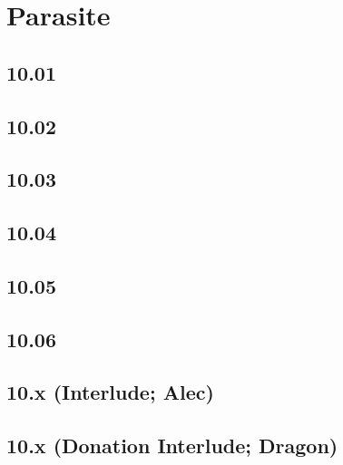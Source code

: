 \part{Parasite}
 \chapter{10.01}
 \chapter{10.02}
 \chapter{10.03}
 \chapter{10.04}
 \chapter{10.05}
 \chapter{10.06}
 \chapter{10.x (Interlude; Alec)}
 \chapter{10.x (Donation Interlude; Dragon)}









